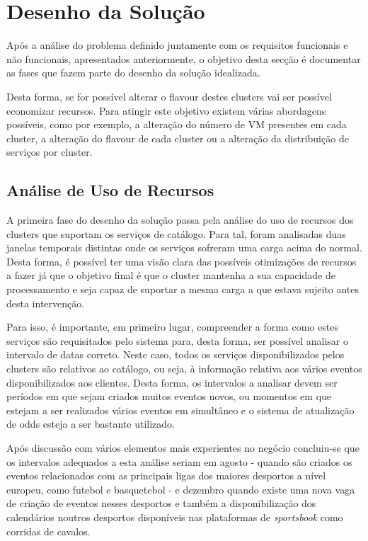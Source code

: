 \section{Desenho da Solução}

Após a análise do problema definido juntamente com os requisitos funcionais e não funcionais,
apresentados anteriormente, o objetivo desta secção é documentar as fases que fazem parte do
desenho da solução idealizada.

Desta forma, se for possível alterar o \gls{flavour} destes \glspl{cluster} vai ser possível economizar
recursos. Para atingir este objetivo existem várias abordagens possíveis, como por exemplo, a
alteração do número de \ac{VM} presentes em cada \gls{cluster}, a alteração do \gls{flavour}
de cada \gls{cluster} ou a alteração da distribuição de serviços por \gls{cluster}.

\subsection{Análise de Uso de Recursos}

A primeira fase do desenho da solução passa pela análise do uso de recursos dos \glspl{cluster}
que suportam os serviços de catálogo. Para tal, foram analisadas duas janelas temporais distintas
onde os serviços sofreram uma carga acima do normal. Desta forma, é possível ter uma visão clara
das possíveis otimizações de recursos a fazer já que o objetivo final é que o \gls{cluster}
mantenha a sua capacidade de processamento e seja capaz de suportar a mesma carga a que estava
sujeito antes desta intervenção.

Para isso, é importante, em primeiro lugar, compreender a forma como estes serviços são requisitados
pelo sistema para, desta forma, ser possível analisar o intervalo de datas correto. Neste caso,
todos os serviços disponibilizados pelos \glspl{cluster} são relativos ao catálogo, ou seja,
à informação relativa aos vários eventos disponibilizados aos clientes. Desta forma, os intervalos
a analisar devem ser períodos em que sejam criados muitos eventos novos, ou momentos em que
estejam a ser realizados vários eventos em simultâneo e o sistema de atualização de \glspl{odd}
esteja a ser bastante utilizado.

Após discussão com vários elementos mais experientes no negócio concluiu-se que os intervalos
adequados a esta análise seriam em agosto - quando são criados os eventos relacionados com as
principais ligas dos maiores desportos a nível europeu, como futebol e basquetebol - e dezembro 
quando existe uma nova vaga de criação de eventos nesses desportos e também a disponibilização 
dos calendários noutros desportos disponíveis nas plataformas de \textit{sportsbook} como
corridas de cavalos.


